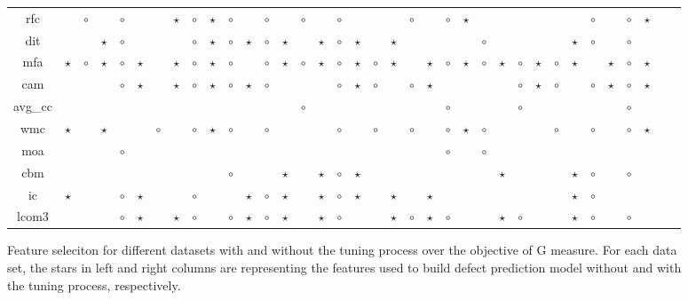 \documentclass{sig-alternative}
\begin{document}
\begin{figure}[!ht]
\begin{tabular}{c|c c|c c|c c|c c|c c|c c|c c|c c|c c|c c|c c|c c|c c|c c|c c|c c|c c|c }
rfc& & $\circ$& & $\circ$& & & $\star$& $\circ$& $\star$& $\circ$& & $\circ$& & $\circ$& & $\circ$& & & & $\circ$& & $\circ$& $\star$& & & & & & & $\circ$& & $\circ$& $\star$& \\
dit& & & $\star$& $\circ$& & & & $\circ$& $\star$& $\circ$& $\star$& $\circ$& $\star$& & $\star$& $\circ$& $\star$& & $\star$& & & & & $\circ$& & & & & $\star$& $\circ$& & $\circ$& & \\
mfa& $\star$& $\circ$& $\star$& $\circ$& $\star$& & $\star$& $\circ$& $\star$& $\circ$& & $\circ$& $\star$& $\circ$& $\star$& $\circ$& $\star$& $\circ$& $\star$& & $\star$& $\circ$& $\star$& $\circ$& $\star$& $\circ$& $\star$& $\circ$& $\star$& & $\star$& $\circ$& $\star$& \\
cam& & & & $\circ$& $\star$& & $\star$& $\circ$& $\star$& $\circ$& $\star$& $\circ$& & & & $\circ$& $\star$& $\circ$& & $\circ$& $\star$& & & & & $\circ$& $\star$& $\circ$& & $\circ$& $\star$& $\circ$& $\star$& \\
avg\_cc& & & & & & & & & & & & & & $\circ$& & & & & & & & $\circ$& & & & $\circ$& & & & & & $\circ$& & \\
wmc& $\star$& & $\star$& & & $\circ$& & $\circ$& $\star$& $\circ$& & $\circ$& & & & $\circ$& & $\circ$& & $\circ$& & $\circ$& $\star$& $\circ$& & & & $\circ$& & $\circ$& & $\circ$& $\star$& \\
moa& & & & $\circ$& & & & & & & & & & & & & & & & & & $\circ$& & $\circ$& & & & & & & & & & \\
cbm& & & & & & & & & & $\circ$& & & $\star$& & $\star$& $\circ$& $\star$& & & & & & & & $\star$& & & & $\star$& $\circ$& & $\circ$& & \\
ic& $\star$& & & $\circ$& $\star$& & & $\circ$& & & $\star$& $\circ$& $\star$& & $\star$& $\circ$& $\star$& & $\star$& & $\star$& & & & & & & & $\star$& $\circ$& & & & \\
lcom3& & & & $\circ$& $\star$& & $\star$& $\circ$& & $\circ$& $\star$& $\circ$& $\star$& & $\star$& $\circ$& & & $\star$& $\circ$& $\star$& $\circ$& & & $\star$& $\circ$& & & $\star$& $\circ$& & $\circ$& & \\

  \end{tabular}
    \caption{Feature seleciton for different datasets with and without the tuning process over the objective of G measure. For each data set, the stars in left and right columns are representing the features used to build defect prediction model without and with the tuning process, respectively.}
\end{figure}
\end{document}
